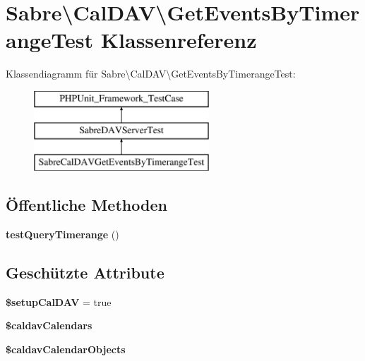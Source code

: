 \hypertarget{class_sabre_1_1_cal_d_a_v_1_1_get_events_by_timerange_test}{}\section{Sabre\textbackslash{}Cal\+D\+AV\textbackslash{}Get\+Events\+By\+Timerange\+Test Klassenreferenz}
\label{class_sabre_1_1_cal_d_a_v_1_1_get_events_by_timerange_test}
Klassendiagramm für Sabre\textbackslash{}Cal\+D\+AV\textbackslash{}Get\+Events\+By\+Timerange\+Test\+:\begin{figure}[H]
\begin{center}
\leavevmode
\includegraphics[height=3.000000cm]{class_sabre_1_1_cal_d_a_v_1_1_get_events_by_timerange_test}
\end{center}
\end{figure}
\subsection*{Öffentliche Methoden}
\begin{DoxyCompactItemize}
\item 
\mbox{\label{class_sabre_1_1_cal_d_a_v_1_1_get_events_by_timerange_test_ab8c49828a92cb102c3be76ea1a887d35}} 
{\bfseries test\+Query\+Timerange} ()
\end{DoxyCompactItemize}
\subsection*{Geschützte Attribute}
\begin{DoxyCompactItemize}
\item 
\mbox{\label{class_sabre_1_1_cal_d_a_v_1_1_get_events_by_timerange_test_a686159392df95c993e970223aec62546}} 
{\bfseries \$setup\+Cal\+D\+AV} = true
\item 
{\bfseries \$caldav\+Calendars}
\item 
{\bfseries \$caldav\+Calendar\+Objects}
\end{DoxyCompactItemize}


